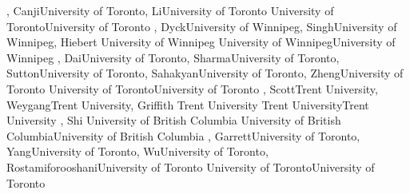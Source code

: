 {
,  {Canji}{University of Toronto},  {Li}{University of Toronto}
}
{University of Toronto}{University of Toronto}
{\bubbleE \enspace \screenE}
{
,  {Dyck}{University of Winnipeg},  {Singh}{University of Winnipeg},  {Hiebert}
{University of Winnipeg}
}
{University of Winnipeg}{University of Winnipeg}
{\bubbleE \enspace \screenE}
{
,  {Dai}{University of Toronto},  {Sharma}{University of Toronto},  {Sutton}{University of Toronto},  {Sahakyan}{University of Toronto},  {Zheng}{University of Toronto}
}
{University of Toronto}{University of Toronto}
{\bubbleE \enspace \screenE}
{
,  {Scott}{Trent University},  {Weygang}{Trent University},  {Griffith}
{Trent University}
}
{Trent University}{Trent University}
{\bubbleE \enspace \screenE}
{
,  {Shi}
{University of British Columbia}
}
{University of British Columbia}{University of British Columbia}
{\bubbleE \enspace \screenE}
{
,  {Garrett}{University of Toronto},  {Yang}{University of Toronto},  {Wu}{University of Toronto},  {Rostamiforooshani}{University of Toronto}
}
{University of Toronto}{University of Toronto}
{\bubbleE \enspace \screenE}



